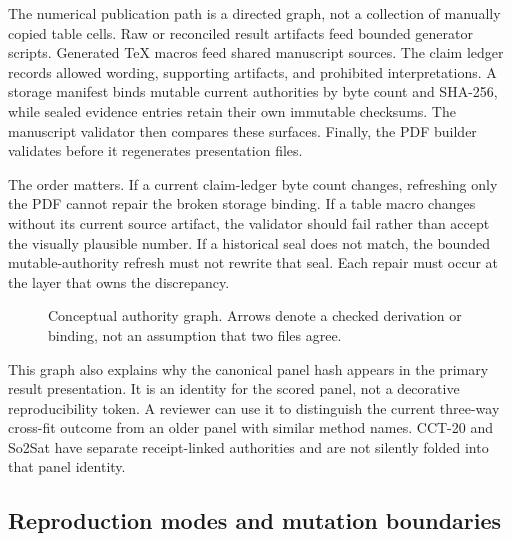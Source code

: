 The numerical publication path is a directed graph, not a collection of manually copied table
cells.  Raw or reconciled result artifacts feed bounded generator scripts.  Generated TeX macros
feed shared manuscript sources.  The claim ledger records allowed wording, supporting artifacts,
and prohibited interpretations.  A storage manifest binds mutable current authorities by byte
count and SHA-256, while sealed evidence entries retain their own immutable checksums.  The
manuscript validator then compares these surfaces.  Finally, the PDF builder validates before it
regenerates presentation files.

The order matters.  If a current claim-ledger byte count changes, refreshing only the PDF cannot
repair the broken storage binding.  If a table macro changes without its current source artifact,
the validator should fail rather than accept the visually plausible number.  If a historical seal
does not match, the bounded mutable-authority refresh must not rewrite that seal.  Each repair must
occur at the layer that owns the discrepancy.

\begin{figure}[H]
\centering
{}
\caption{Conceptual authority graph.  Arrows denote a checked derivation or binding, not an
assumption that two files agree.}
\label{fr:fig-authority-graph}
\end{figure}

This graph also explains why the canonical panel hash appears in the primary result presentation.
It is an identity for the scored panel, not a decorative reproducibility token.  A reviewer can
use it to distinguish the current three-way cross-fit outcome from an older panel with similar
method names.  CCT-20 and So2Sat have separate receipt-linked authorities and are not silently
folded into that panel identity.

\subsection{Reproduction modes and mutation boundaries}
\label{fr:reproduction-modes}

